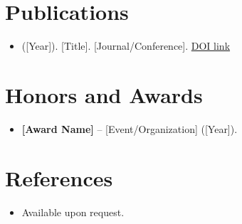 \documentclass[11pt,a4paper,sans]{moderncv}
\begin{document}
\section{Publications}
\vspace{1pt}
\begin{itemize}
\item [Author(s)] ([Year]). [Title]. [Journal/Conference]. \href{[DOI_URL]}{DOI link}
\end{itemize}


\section{Honors and Awards}
\vspace{1pt}
\begin{itemize}
\item{\textbf{[Award Name]} -- [Event/Organization] ([Year]).}
\end{itemize}


\section{References}
\vspace{1pt}
\begin{itemize}
\item{Available upon request.}
\end{itemize}
\end{document}

